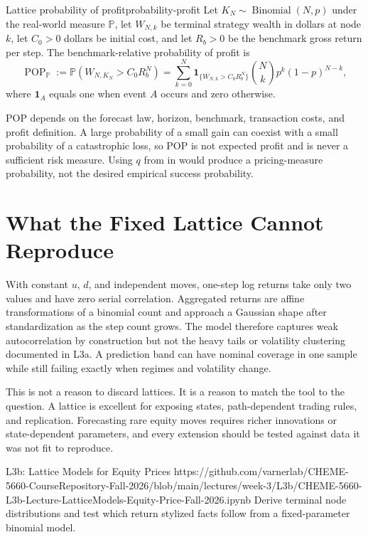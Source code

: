 \documentclass[11pt]{article}
\newcommand{\Pmeasure}{\mathbb{P}}
\begin{document}
\begin{definition}{Lattice probability of profit}{probability-profit}
Let $K_N\sim\operatorname{Binomial}(N,p)$ under the real-world measure $\Pmeasure$, let $W_{N,k}$ be terminal strategy wealth in dollars at node $k$, let $C_0>0$ dollars be initial cost, and let $R_b>0$ be the benchmark gross return per step. The benchmark-relative probability of profit is
\begin{equation}
  \label{eq:probability-profit}
  \operatorname{POP}_{\Pmeasure}
  :=\Pmeasure\!\left(W_{N,K_N}>C_0R_b^N\right)
  =\sum_{k=0}^{N}\mathbf{1}_{\{W_{N,k}>C_0R_b^N\}}
  \binom{N}{k}p^k(1-p)^{N-k},
\end{equation}
where $\mathbf{1}_{A}$ equals one when event $A$ occurs and zero otherwise.
\end{definition}

POP depends on the forecast law, horizon, benchmark, transaction costs, and profit definition. A large probability of a small gain can coexist with a small probability of a catastrophic loss, so POP is not expected profit and is never a sufficient risk measure. Using $q$ from  in  would produce a pricing-measure probability, not the desired empirical success probability.

\section{What the Fixed Lattice Cannot Reproduce}

With constant $u$, $d$, and independent moves, one-step log returns take only two values and have zero serial correlation. Aggregated returns are affine transformations of a binomial count and approach a Gaussian shape after standardization as the step count grows. The model therefore captures weak autocorrelation by construction but not the heavy tails or volatility clustering documented in L3a. A prediction band can have nominal coverage in one sample while still failing exactly when regimes and volatility change.

This is not a reason to discard lattices. It is a reason to match the tool to the question. A lattice is excellent for exposing states, path-dependent trading rules, and replication. Forecasting rare equity moves requires richer innovations or state-dependent parameters, and every extension should be tested against data it was not fit to reproduce.

\notebooklink
  {L3b: Lattice Models for Equity Prices}
  {https://github.com/varnerlab/CHEME-5660-CourseRepository-Fall-2026/blob/main/lectures/week-3/L3b/CHEME-5660-L3b-Lecture-LatticeModels-Equity-Price-Fall-2026.ipynb}
  {Derive terminal node distributions and test which return stylized facts follow from a fixed-parameter binomial model.}
\end{document}
